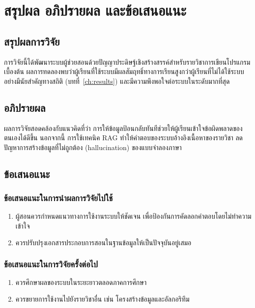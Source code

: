 \chapter{สรุปผล อภิปรายผล และข้อเสนอแนะ}
\label{ch:conclusion}

\section{สรุปผลการวิจัย}

การวิจัยนี้ได้พัฒนาระบบผู้ช่วยสอนด้วยปัญญาประดิษฐ์เชิงสร้างสรรค์สำหรับรายวิชาการเขียนโปรแกรมเบื้องต้น ผลการทดลองพบว่าผู้เรียนที่ใช้ระบบมีผลสัมฤทธิ์ทางการเรียนสูงกว่าผู้เรียนที่ไม่ได้ใช้ระบบอย่างมีนัยสำคัญทางสถิติ (บทที่~\ref{ch:results}) และมีความพึงพอใจต่อระบบในระดับมากที่สุด

\section{อภิปรายผล}

ผลการวิจัยสอดคล้องกับแนวคิดที่ว่า การให้ข้อมูลป้อนกลับทันทีช่วยให้ผู้เรียนเข้าใจข้อผิดพลาดของตนเองได้ดีขึ้น นอกจากนี้ การใช้เทคนิค RAG ทำให้คำตอบของระบบอ้างอิงเนื้อหาของรายวิชา ลดปัญหาการสร้างข้อมูลที่ไม่ถูกต้อง (hallucination) ของแบบจำลองภาษา

\section{ข้อเสนอแนะ}

\subsection{ข้อเสนอแนะในการนำผลการวิจัยไปใช้}
\begin{enumerate}
  \item ผู้สอนควรกำหนดแนวทางการใช้งานระบบให้ชัดเจน เพื่อป้องกันการคัดลอกคำตอบโดยไม่ทำความเข้าใจ
  \item ควรปรับปรุงเอกสารประกอบการสอนในฐานข้อมูลให้เป็นปัจจุบันอยู่เสมอ
\end{enumerate}

\subsection{ข้อเสนอแนะในการวิจัยครั้งต่อไป}
\begin{enumerate}
  \item ควรศึกษาผลของระบบในระยะยาวตลอดภาคการศึกษา
  \item ควรขยายการใช้งานไปยังรายวิชาอื่น เช่น โครงสร้างข้อมูลและอัลกอริทึม
\end{enumerate}
